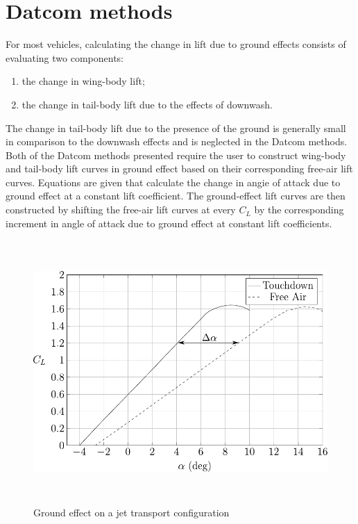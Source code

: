 \section{Datcom methods}
\label{sec:sec3}
For most vehicles, calculating the change in lift due to ground effects consists of evaluating two
components:
 \begin{enumerate}
 \item the change in wing-body lift;
 \item the change in tail-body lift due to the effects of downwash.
 \end{enumerate}
 
The change in tail-body lift due to the presence of the ground is generally small in comparison to
the downwash effects and is neglected in the Datcom methods.\\
Both of the Datcom methods presented require the user to construct wing-body and tail-body lift
curves in ground effect based on their corresponding free-air lift curves. Equations are given that
calculate the change in angie of attack due to ground effect at a constant lift coefficient. The
ground-effect lift curves are then constructed by shifting the free-air lift curves at every $C_L$ by the
corresponding increment in angle of attack due to ground effect at constant lift coefficients.

\begin{figure}[htbp]
	\centering
	\includegraphics[height=10cm, keepaspectratio ]{Immagini/Capitolo2/disegno} 
	\caption{Ground effect on a jet transport configuration} %
	\label{fig:figura2_3_1} %
\end{figure}

